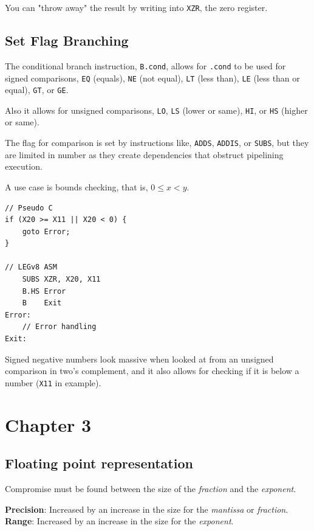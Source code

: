 \documentclass[11pt]{article}
\begin{document}
You can "throw away" the result by writing into \texttt{XZR}, the zero register.

\subsection*{Set Flag Branching}

The conditional branch instruction, \texttt{B.cond}, allows for \texttt{.cond} to be used for signed comparisons, \texttt{EQ} (equals), \texttt{NE} (not equal), \texttt{LT} (less than), \texttt{LE} (less than or equal), \texttt{GT}, or \texttt{GE}.

Also it allows for unsigned comparisons, \texttt{LO}, \texttt{LS} (lower or same), \texttt{HI}, or \texttt{HS} (higher or same).

The flag for comparison is set by instructions like, \texttt{ADDS}, \texttt{ADDIS}, or \texttt{SUBS}, but they are limited in number as they create dependencies that obstruct pipelining execution.

A use case is bounds checking, that is, $0\le x < y$.
\pagebreak

\begin{lstlisting}[caption={Bounds checking shortcut in LEGv8 ASM}]
// Pseudo C
if (X20 >= X11 || X20 < 0) {
    goto Error;
}

// LEGv8 ASM
    SUBS XZR, X20, X11
    B.HS Error
    B    Exit
Error:
    // Error handling
Exit:
\end{lstlisting}

Signed negative numbers look massive when looked at from an unsigned comparison in two's complement, and it also allows for checking if it is below a number (\texttt{X11} in example).

\pagebreak

\section*{Chapter 3}

\subsection*{Floating point representation}

Compromise must be found between the size of the \textit{fraction} and the \textit{exponent}.

\begin{tcolorbox}[
    enhanced,
    attach boxed title to top left={xshift=6mm,yshift=-1.5mm},
    colback=moonstoneblue!20,
    colframe=moonstoneblue,
    colbacktitle=moonstoneblue,
    title=Tradeoff of floating-point representation,
    fonttitle=\bfseries\color{white},
    boxed title style={size=small,colframe=moonstoneblue,sharp corners},
    sharp corners,
    label=box:logic-types,
]
    {\color{moondark}\textbf{Precision}}: Increased by an increase in the size for the \textit{mantissa} or \textit{fraction}. \\
    {\color{moondark}\textbf{Range}}: Increased by an increase in the size for the \textit{exponent}.
\end{tcolorbox}
\end{document}
